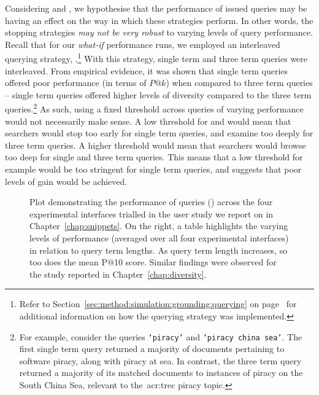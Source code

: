 Considering  and , we hypothesise that the performance of issued queries may be having an effect on the way in which these strategies perform. In other words, the stopping strategies \emph{may not be very robust} to varying levels of query performance. Recall that for our \emph{what-if} performance runs, we employed an interleaved querying strategy, .\footnote{Refer to Section~\ref{sec:method:simulation:grounding:querying} on page~\pageref{sec:method:simulation:grounding:querying} for additional information on how the querying strategy was implemented.} With this strategy, single term and three term queries were interleaved. From empirical evidence, it was shown that single term queries offered poor performance (in terms of $P@k$) when compared to three term queries -- single term queries offered higher levels of diversity compared to the three term queries.\footnote{For example, consider the queries \texttt{`piracy'} and \texttt{`piracy china sea'}. The first single term query returned a majority of documents pertaining to software piracy, along with piracy at sea. In contrast, the three term query returned a majority of its matched documents to instances of piracy on the South China Sea, relevant to the~\gls{acr:trec} piracy topic.} As such, using a fixed threshold across queries of varying performance would not necessarily make sense. A low threshold for  and  would mean that searchers would stop too early for single term queries, and examine too deeply for three term queries. A higher threshold would mean that searchers would browse too deep for single and three term queries. This means that a low threshold for example would be too stringent for single term queries, and suggests that poor levels of gain would be achieved.

\begin{figure}[t!]
    \centering
    \caption[Query performance by real-world subjects]{Plot demonstrating the performance of queries () across the four experimental interfaces trialled in the user study we report on in Chapter~\ref{chap:snippets}. On the right, a table highlights the varying levels of performance (averaged over all four experimental interfaces) in relation to query term lengths. As query term length increases, so too does the mean P@10 score. Similar findings were observed for the study reported in Chapter~\ref{chap:diversity}.}
    \label{fig:query_performance_ch7}
\end{figure}

